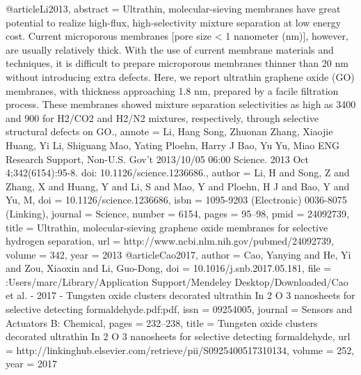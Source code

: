 @article{Li2013,
abstract = {Ultrathin, molecular-sieving membranes have great potential to realize high-flux, high-selectivity mixture separation at low energy cost. Current microporous membranes [pore size {\textless} 1 nanometer (nm)], however, are usually relatively thick. With the use of current membrane materials and techniques, it is difficult to prepare microporous membranes thinner than 20 nm without introducing extra defects. Here, we report ultrathin graphene oxide (GO) membranes, with thickness approaching 1.8 nm, prepared by a facile filtration process. These membranes showed mixture separation selectivities as high as 3400 and 900 for H2/CO2 and H2/N2 mixtures, respectively, through selective structural defects on GO.},
annote = {Li, Hang
Song, Zhuonan
Zhang, Xiaojie
Huang, Yi
Li, Shiguang
Mao, Yating
Ploehn, Harry J
Bao, Yu
Yu, Miao
ENG
Research Support, Non-U.S. Gov't
2013/10/05 06:00
Science. 2013 Oct 4;342(6154):95-8. doi: 10.1126/science.1236686.},
author = {Li, H and Song, Z and Zhang, X and Huang, Y and Li, S and Mao, Y and Ploehn, H J and Bao, Y and Yu, M},
doi = {10.1126/science.1236686},
isbn = {1095-9203 (Electronic)
0036-8075 (Linking)},
journal = {Science},
number = {6154},
pages = {95--98},
pmid = {24092739},
title = {{Ultrathin, molecular-sieving graphene oxide membranes for selective hydrogen separation}},
url = {http://www.ncbi.nlm.nih.gov/pubmed/24092739},
volume = {342},
year = {2013}
}
@article{Cao2017,
author = {Cao, Yanying and He, Yi and Zou, Xiaoxin and Li, Guo-Dong},
doi = {10.1016/j.snb.2017.05.181},
file = {:Users/marc/Library/Application Support/Mendeley Desktop/Downloaded/Cao et al. - 2017 - Tungsten oxide clusters decorated ultrathin In 2 O 3 nanosheets for selective detecting formaldehyde.pdf:pdf},
issn = {09254005},
journal = {Sensors and Actuators B: Chemical},
pages = {232--238},
title = {{Tungsten oxide clusters decorated ultrathin In 2 O 3 nanosheets for selective detecting formaldehyde}},
url = {http://linkinghub.elsevier.com/retrieve/pii/S0925400517310134},
volume = {252},
year = {2017}
}
